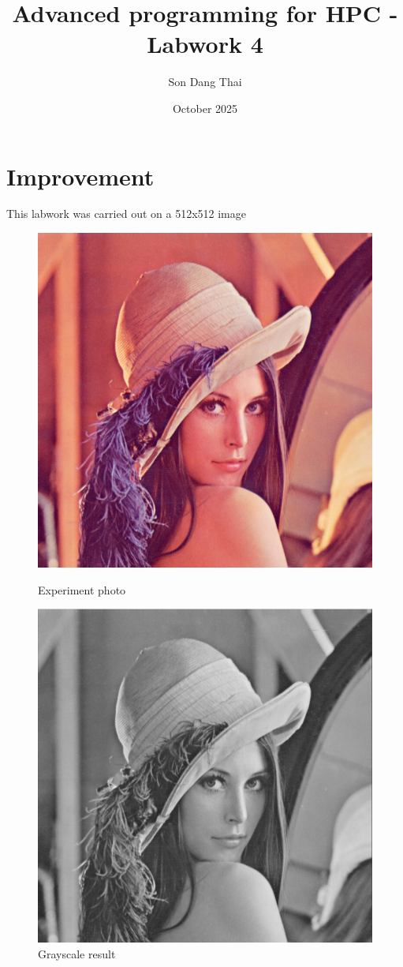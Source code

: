 \documentclass{article}
\title{Advanced programming for HPC - Labwork 4}
\author{Son Dang Thai}
\date{October 2025}
\begin{document}
\maketitle

\section{Improvement}
This labwork was carried out on a 512x512 image

\begin{figure}[!htb]
    \begin{minipage}{0.48\textwidth}
        \centering
        \includegraphics[width=.7\linewidth]{lenna.png}
        \caption{Experiment photo}
        \label{fig:rgb}
    \end{minipage}\hfill
    \begin{minipage}{0.48\textwidth}
        \centering
        \includegraphics[width=.7\linewidth]{lenna_grayscale.png}
        \caption{Grayscale result}
        \label{fig:grayscale}
    \end{minipage}\hfill
\end{figure}
\end{document}
